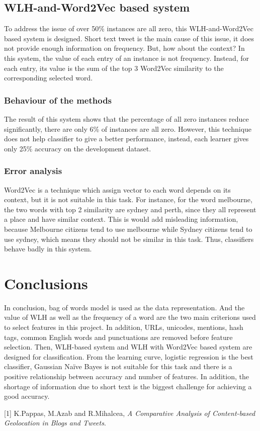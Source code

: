 \documentclass[11pt]{article}
\begin{document}
\subsection{WLH-and-Word2Vec based system}
To address the issue of over 50\% instances are all zero, this WLH-and-Word2Vec based system is designed. Short text tweet is the main cause of this issue, it does not provide enough information on frequency. But, how about the context? In this system, the value of each entry of an instance is not frequency. Instead, for each entry, its value is the sum of the top 3 Word2Vec similarity to the corresponding selected word.\\
\subsubsection{Behaviour of the methods} 
The result of this system shows that the percentage of all zero instances reduce significantly, there are only 6\% of instances are all zero. However, this technique does not help classifier to give a better performance, instead, each learner gives only 25\% accuracy on the development dataset.
\subsubsection{Error analysis}
Word2Vec is a technique which assign vector to each word depends on its context, but it is not suitable in this task. For instance, for the word melbourne, the two words with top 2 similarity are sydney and perth, since they all represent a place and have similar context. This is would add misleading information, because Melbourne citizens tend to use melbourne while Sydney citizens tend to use sydney, which means they should not be similar in this task. Thus, classifiers behave badly in this system.

\section{Conclusions}

In conclusion, bag of words model is used as the data representation. And the value of WLH as well as the frequency of a word are the two main criterions used to select features in this project. In addition, URLs, unicodes, mentions, hash tags, common English words and punctuations are removed before feature selection. Then, WLH-based system and WLH with Word2Vec based system are designed for classification. From the learning curve, logistic regression is the best classifier, Gaussian Naïve Bayes is not suitable for this task and there is a positive relationship between accuracy and number of features. In addition, the shortage of information due to short text is the biggest challenge for achieving a good accuracy.


\begin{thebibliography}{2018}
	\bibitem{[PapAzaMih18}
	[1] K.Pappas, M.Azab and R.Mihalcea,
	\emph{A Comparative Analysis of Content-based Geolocation in Blogs and Tweets}.
	
\end{thebibliography}
\end{document}

